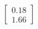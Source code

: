 \documentclass[preview]{standalone}
\begin{document}
\begin{align*}
\begin{bmatrix} 0.18 \\ 1.66 \end{bmatrix}
\end{align*}
\end{document}
